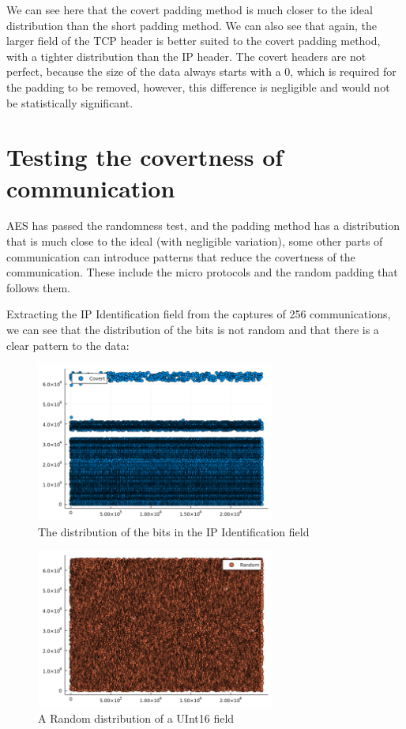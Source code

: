 We can see here that the covert padding method is much closer to the ideal distribution than the short padding method. We can also see that again, the larger field of the TCP header is better suited to the covert padding method, with a tighter distribution than the IP header. The covert headers are not perfect, because the size of the data always starts with a 0, which is required for the padding to be removed, however, this difference is negligible and would not be statistically significant.

\section{Testing the covertness of communication}

AES has passed the randomness test, and the padding method has a distribution that is much close to the ideal (with negligible variation), some other parts of communication can introduce patterns that reduce the covertness of the communication. These include the micro protocols and the random padding that follows them.

Extracting the IP Identification field from the captures of 256 communications, we can see that the distribution of the bits is not random and that there is a clear pattern to the data:

\begin{figure}[h]
    \centering
    \includegraphics[width=0.7\textwidth]{fig/covert.png}
    \caption{The distribution of the bits in the IP Identification field}
    \label{fig:Covert_field}
\end{figure}

\begin{figure}[h]
    \centering
    \includegraphics[width=0.7\textwidth]{fig/random.png}
    \caption{A Random distribution of a UInt16 field}
    \label{fig:RandomUInt16}
\end{figure}

